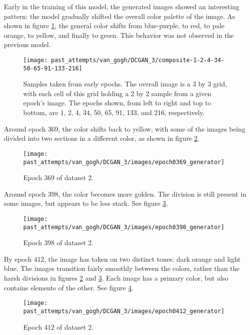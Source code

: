 \documentclass[11pt,letterpaper]{article}
\begin{document}
				Early in the training of this model, the generated images showed an interesting pattern: the model gradually shifted the overall color palette of the image.
				As shown in figure \ref{fig:cgvg:composite-1-2-4-34-50-65-91-133-216}, the general color shifts from blue-purple, to red, to pale orange, to yellow, and finally to green.
				This behavior was not observed in the previous model.
				\begin{figure}
					\centering
					\texttt{[image: past\_attempts/van\_gogh/DCGAN\_3/composite-1-2-4-34-50-65-91-133-216]}
					\caption[Samples of images from early epochs]{Samples taken from early epochs. The overall image is a 3 by 3 grid, with each cell of this grid holding a 2 by 2 sample from a given epoch's image. The epochs shown, from left to right and top to bottom, are 1, 2, 4, 34, 50, 65, 91, 133, and 216, respectively.}
					\label{fig:cgvg:composite-1-2-4-34-50-65-91-133-216}
				\end{figure}

				Around epoch 369, the color shifts back to yellow, with some of the images being divided into two sections in a different color, as shown in figure \ref{fig:cgvg:epoch0369generator}.
				\begin{figure}
					\centering
					\texttt{[image: past\_attempts/van\_gogh/DCGAN\_3/images/epoch0369\_generator]}
					\caption{Epoch 369 of dataset 2.}
					\label{fig:cgvg:epoch0369generator}
				\end{figure}

				Around epoch 398, the color becomes more golden.
				The division is still present in some images, but appears to be less stark.
				See figure \ref{fig:cgvg:epoch0398generator}.
				\begin{figure}
					\centering
					\texttt{[image: past\_attempts/van\_gogh/DCGAN\_3/images/epoch0398\_generator]}
					\caption{Epoch 398 of dataset 2.}
					\label{fig:cgvg:epoch0398generator}
				\end{figure}

				By epoch 412, the image has taken on two distinct tones: dark orange and light blue.
				The images transition fairly smoothly between the colors, rather than the harsh divisions in figures \ref{fig:cgvg:epoch0369generator} and \ref{fig:cgvg:epoch0398generator}.
				Each image has a primary color, but also contains elements of the other.
				See figure \ref{fig:cgvg:epoch0412generator}.
				\begin{figure}
					\centering
					\texttt{[image: past\_attempts/van\_gogh/DCGAN\_3/images/epoch0412\_generator]}
					\caption{Epoch 412 of dataset 2.}
					\label{fig:cgvg:epoch0412generator}
				\end{figure}
\end{document}
